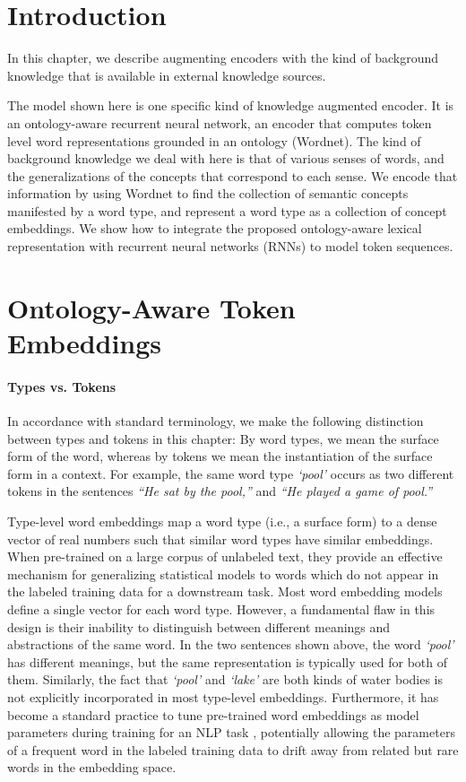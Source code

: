 \section{Introduction}
In this chapter, we describe augmenting encoders with the kind of background
knowledge that is available in external knowledge sources.

The model shown here is one specific kind of knowledge augmented encoder. It is an
ontology-aware recurrent neural network, an encoder that computes token level 
word representations grounded in an ontology (Wordnet).
The kind of background knowledge we deal with here is that of various senses of
words, and the generalizations of the concepts that correspond to each sense.
We encode that information by using Wordnet to find the 
collection of semantic concepts manifested by a word type, and represent a word 
type as a collection of concept embeddings. We show
how to integrate the proposed ontology-aware lexical representation with 
recurrent neural networks (RNNs) to model token sequences.

\section{Ontology-Aware Token Embeddings}
\paragraph{Types vs. Tokens} In accordance with standard terminology, we make
the following distinction 
between types and tokens in this chapter: By word types, we mean the surface form 
of the word, whereas by tokens we mean the instantiation of the surface form in 
a context. For example, the same word type \textit{`pool'} occurs as two 
different tokens in the sentences \textit{``He sat by the pool,''} and 
\textit{``He played a game of pool.''}

Type-level word embeddings map a word type (i.e., a surface form) to a dense 
vector of real numbers such that similar word types have similar embeddings. 
When pre-trained on a large corpus of unlabeled text, they provide an effective 
mechanism for generalizing statistical models to words which do not appear in 
the labeled training data for a downstream task. Most word embedding models 
define a single vector for each word type. However, a 
fundamental flaw in this design is their inability to distinguish between 
different meanings and abstractions of the same word. In the two sentences shown 
above, the word \textit{`pool'} has different meanings, but the same 
representation is typically used for both of them. Similarly, the fact that 
\textit{`pool'} and \textit{`lake'} are both kinds of water bodies is not 
explicitly incorporated in most type-level embeddings.
Furthermore, it has become a standard practice to tune pre-trained word 
embeddings as model parameters during training for an NLP task 
\cite[e.g.,][]{chen:14,lample:16}, potentially allowing the parameters of a 
frequent word in the labeled training data to drift away from related but rare 
words in the embedding space. 

